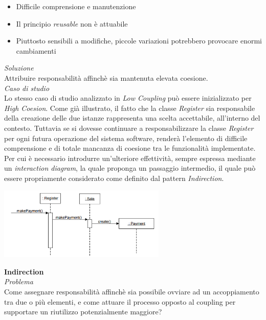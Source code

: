 \documentclass{article}
\begin{document}
\begin{itemize}[label={-}]
    \itemsep0em
    \item Difficile comprensione e manutenzione
    \item Il principio \textit{reusable} non è attuabile
    \item Piuttosto sensibili a modifiche, piccole variazioni potrebbero provocare enormi cambiamenti
\end{itemize}\vspace*{7pt}
\textit{Soluzione}\\
Attribuire responsabilità affinchè sia mantenuta elevata coesione.\vspace*{14pt}\\
\textit{Caso di studio}\\
Lo stesso caso di studio analizzato in \textit{Low Coupling} può essere inizializzato per \textit{High Coesion}. Come già illustrato, il fatto che la classe \textit{Register} sia responsabile della creazione delle due istanze rappresenta una scelta accettabile, all'interno del contesto. Tuttavia se si dovesse continuare a responsabilizzare la classe \textit{Register} per ogni futura operazione del sistema software, renderà l'elemento di difficile comprensione e di totale mancanza di coesione tra le funzionalità implementate. Per cui è necessario introdurre un'ulteriore effettività, sempre espressa mediante un \textit{interaction diagram}, la quale proponga un passaggio intermedio, il quale può essere propriamente considerato come definito dal pattern \textit{Indirection}.
\begin{center}
    \includegraphics[width=0.6\textwidth]{foto 4.png}\vspace{7pt}
\end{center}
\textbf{Indirection}\vspace*{7pt}\\
\textit{Problema}\\
Come assegnare responsabilità affinchè sia possibile ovviare ad un accoppiamento tra due o più elementi, e come attuare il processo opposto al coupling per supportare un riutilizzo potenzialmente maggiore?\vspace*{14pt}\\
\end{document}
